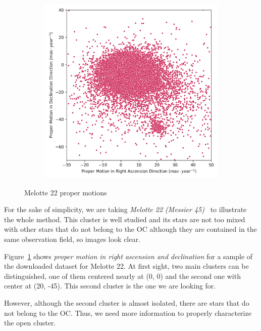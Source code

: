 \documentclass[11pt, a4paper, english]{book}
\begin{document}
\begin{figure}[htbp]
  \centering
  \begin{subfigure}{0.5\textwidth}
    \centering
    \includegraphics[width=\textwidth]{../figures/melotte_22/raw_pm_melotte_22.png}
  \end{subfigure}
  \caption{Melotte 22 proper motions}
  \label{fig:raw_pm_melotte_22}
\end{figure}

For the sake of simplicity, we are taking \emph{Melotte 22 (Messier 45)}~\cite{elsanhoury2019ppmxl} to illustrate the whole method.
This cluster is well studied and its stars are not too mixed with other stars that do not belong to the OC
although they are contained in the same observation field, so images look clear.

Figure~\ref{fig:raw_pm_melotte_22} shows \emph{proper motion in right ascension and declination}
for a sample of the downloaded dataset for Melotte 22.
At first sight, two main clusters can be distinguished, one of them centered nearly at (0, 0)
and the second one with center at (20, -45). This second cluster is the one we are looking for.

However, although the second cluster is almost isolated, there are stars that do not belong to the OC.
Thus, we need more information to properly characterize the open cluster.
\end{document}
